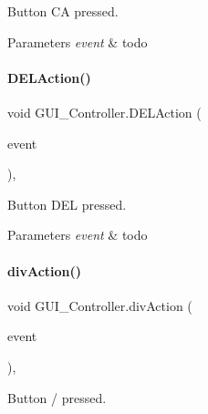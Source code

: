 Button \textquotesingle{}CA\textquotesingle{} pressed. 


\begin{DoxyParams}{Parameters}
{\em event} & todo \\
\hline
\end{DoxyParams}
\mbox{\label{classGUI__Controller_a491246305bbe61ee5267a9b3a06fb3cb}} 
\paragraph{\texorpdfstring{D\+E\+L\+Action()}{DELAction()}}
{\footnotesize\ttfamily void G\+U\+I\+\_\+\+Controller.\+D\+E\+L\+Action (\begin{DoxyParamCaption}\item[{Action\+Event}]{event }\end{DoxyParamCaption})\hspace{0.3cm}{\ttfamily [inline]}, {\ttfamily [private]}}



Button \textquotesingle{}D\+EL\textquotesingle{} pressed. 


\begin{DoxyParams}{Parameters}
{\em event} & todo \\
\hline
\end{DoxyParams}
\mbox{\label{classGUI__Controller_aa8ff04e83edf0943671173ccb7fcb716}} 
\paragraph{\texorpdfstring{div\+Action()}{divAction()}}
{\footnotesize\ttfamily void G\+U\+I\+\_\+\+Controller.\+div\+Action (\begin{DoxyParamCaption}\item[{Action\+Event}]{event }\end{DoxyParamCaption})\hspace{0.3cm}{\ttfamily [inline]}, {\ttfamily [private]}}



Button \textquotesingle{}/\textquotesingle{} pressed. 


